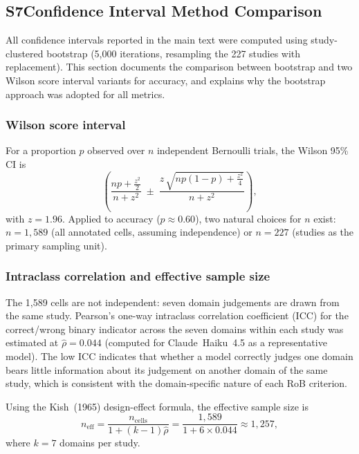 \documentclass[../main.tex]{subfiles}
\begin{document}
\subsection*{S7\quad Confidence Interval Method Comparison}
\label{sec:si-ci}

All confidence intervals reported in the main text were computed using
study-clustered bootstrap (5{,}000 iterations, resampling the 227 studies
with replacement).
This section documents the comparison between bootstrap and two Wilson score
interval variants for accuracy, and explains why the bootstrap approach was
adopted for all metrics.

\subsubsection*{Wilson score interval}

For a proportion $p$ observed over $n$ independent Bernoulli trials,
the Wilson 95\% CI is
\begin{equation}
  \left(
    \frac{n p + \tfrac{z^2}{2}}{n + z^2}
    \;\pm\;
    \frac{z\,\sqrt{n p(1-p) + \tfrac{z^2}{4}}}{n + z^2}
  \right),
  \label{eq:wilson}
\end{equation}
with $z = 1.96$.
Applied to accuracy ($p \approx 0.60$), two natural choices for $n$ exist:
$n = 1{,}589$ (all annotated cells, assuming independence) or
$n = 227$ (studies as the primary sampling unit).

\subsubsection*{Intraclass correlation and effective sample size}

The 1{,}589 cells are not independent: seven domain judgements are drawn from
the same study.
Pearson's one-way intraclass correlation coefficient (ICC) for the
correct/wrong binary indicator across the seven domains within each study
was estimated at $\hat\rho = 0.044$ (computed for Claude~Haiku~4.5 as a
representative model).
The low ICC indicates that whether a model correctly judges one domain bears
little information about its judgement on another domain of the same study,
which is consistent with the domain-specific nature of each RoB criterion.

Using the Kish~(1965) design-effect formula, the effective sample size is
\begin{equation}
  n_{\text{eff}} = \frac{n_{\text{cells}}}{1 + (k-1)\hat\rho}
                = \frac{1{,}589}{1 + 6 \times 0.044} \approx 1{,}257,
  \label{eq:neff}
\end{equation}
where $k = 7$ domains per study.
\end{document}
